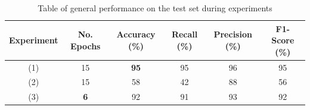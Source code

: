 \documentclass[a4paper]{article}
\begin{document}
\begin{table}[h] 
\caption{Table of general performance on the test set during experiments}
\label{tab:experiment1}
\centering
\begin{adjustbox}{width=\linewidth}

\begin{tabular}{c c c c c c} %
\hline   
 Experiment & No. Epochs & Accuracy (\%)  & Recall (\%) & Precision (\%) & F1-Score (\%) \\
\hline\hline
(1) & 15 & \textbf{95} & 95 & 96 & 95\\
(2) & 15  & 58  & 42 & 88 & 56\\
(3) & \textbf{6}  & 92  & 91 & 93 & 92\\
\hline
\end{tabular}
\end{adjustbox}
\end{table}



\end{document}
